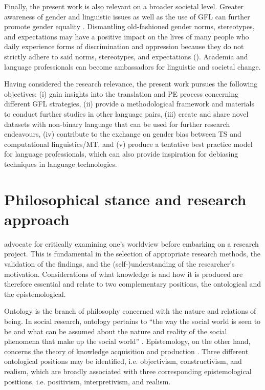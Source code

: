 Finally, the present work is also relevant on a broader societal level. Greater awareness of gender and linguistic issues as well as the use of GFL can further promote gender equality \citep{sczesny2016can}. Dismantling old-fashioned gender norms, stereotypes, and expectations may have a positive impact on the lives of many people who daily experience forms of discrimination and oppression because they do not strictly adhere to said norms, stereotypes, and expectations (\cite{barker2019life}). Academia and language professionals can become ambassadors for linguistic and societal change.

Having considered the research relevance, the present work pursues the following objectives: (i) gain insights into the translation and PE process concerning different GFL strategies, (ii) provide a methodological framework and materials to conduct further studies in other language pairs, (iii) create and share novel datasets with non-binary language that can be used for further research endeavours, (iv) contribute to the exchange on gender bias between TS and computational linguistics/MT, and (v) produce a tentative best practice model for language professionals, which can also provide inspiration for debiasing techniques in language technologies.

\section{Philosophical stance and research approach}
\textcite[10]{saldanha2014research} advocate for critically examining one’s worldview before embarking on a research project. This is fundamental in the selection of appropriate research methods, the validation of the findings, and the (self-)understanding of the researcher’s motivation. Considerations of what knowledge is and how it is produced are therefore essential and relate to two complementary positions, the ontological and the epistemological. 

Ontology is the branch of philosophy concerned with the nature and relations of being. In social research, ontology pertains to “the way the social world is seen to be and what can be assumed about the nature and reality of the social phenomena that make up the social world” \citep[23]{matthews2010research}. Epistemology, on the other hand, concerns the theory of knowledge acquisition and production \citep[23]{matthews2010research}. Three different ontological positions may be identified, i.e. objectivism, constructivism, and realism, which are broadly associated with three corresponding epistemological positions, i.e. positivism, interpretivism, and realism.

